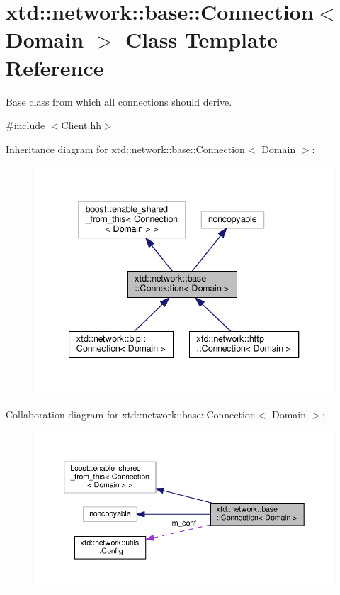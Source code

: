 \hypertarget{classxtd_1_1network_1_1base_1_1Connection}{\section{xtd\-:\-:network\-:\-:base\-:\-:Connection$<$ Domain $>$ Class Template Reference}
\label{classxtd_1_1network_1_1base_1_1Connection}
}


Base class from which all connections should derive.  




{\ttfamily \#include $<$Client.\-hh$>$}



Inheritance diagram for xtd\-:\-:network\-:\-:base\-:\-:Connection$<$ Domain $>$\-:
\nopagebreak
\begin{figure}[H]
\begin{center}
\leavevmode
\includegraphics[width=340pt]{classxtd_1_1network_1_1base_1_1Connection__inherit__graph}
\end{center}
\end{figure}


Collaboration diagram for xtd\-:\-:network\-:\-:base\-:\-:Connection$<$ Domain $>$\-:
\nopagebreak
\begin{figure}[H]
\begin{center}
\leavevmode
\includegraphics[width=350pt]{classxtd_1_1network_1_1base_1_1Connection__coll__graph}
\end{center}
\end{figure}
